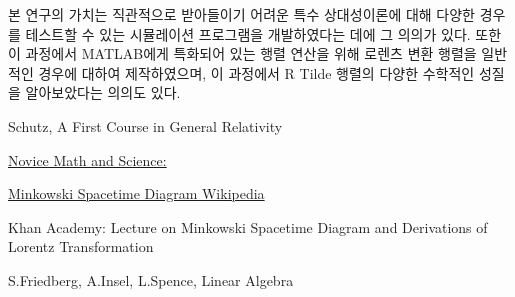 \documentclass{thesis-SJ}
\begin{document}
본 연구의 가치는 직관적으로 받아들이기 어려운 특수 상대성이론에 대해 다양한 경우를 테스트할 수 있는 시뮬레이션 프로그램을 개발하였다는 데에 그 의의가 있다. 또한 이 과정에서 MATLAB에게 특화되어 있는 행렬 연산을 위해 로렌츠 변환 행렬을 일반적인 경우에 대하여 제작하였으며, 이 과정에서 R Tilde 행렬의 다양한 수학적인 성질을 알아보았다는 의의도 있다.
\newpage
\begin{thebibliography}{10}
	Schutz, A First Course in General Relativity
	
	\href{http://novicemathandscience.blogspot.com/2012/04/hermann-german.html}{Novice Math and Science:}
	
	\href{https://en.wikipedia.org/wiki/Minkowski_diagram
	}{Minkowski Spacetime Diagram Wikipedia}
	
	Khan Academy: 	Lecture on Minkowski Spacetime Diagram 
	and Derivations of Lorentz Transformation
	
	S.Friedberg, A.Insel, L.Spence, Linear Algebra
	
	
\end{thebibliography}
\end{document}
